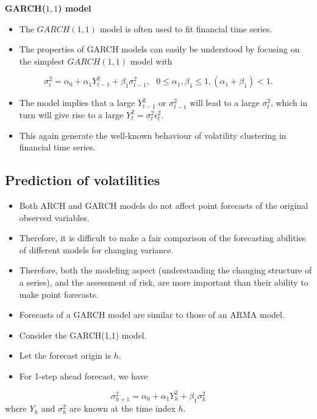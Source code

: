 \documentclass[]{book}
\providecommand{\tightlist}{%
  \setlength{\itemsep}{0pt}\setlength{\parskip}{0pt}}
\begin{document}
\textbf{GARCH(\(1,1\)) model}

\begin{itemize}
\tightlist
\item
  The \(GARCH(1,1)\) model is often used to fit financial time series.
\item
  The properties of GARCH models can easily be understood by focusing
  on the simplest \(GARCH(1,1)\) model with
\end{itemize}

\[\sigma_t^2 = \alpha_0+\alpha_1Y_{t-1}^2 + \beta_1\sigma_{t-1}^2, \text{  } 0\leq\alpha_1, \beta_1\leq 1, (\alpha_1+\beta_1)<1.\]

\begin{itemize}
\tightlist
\item
  The model implies that a large \(Y_{t-1}^2\) or \(\sigma_{t-1}^2\) will lead to a large \(\sigma_{t}^2\), which in turn will give rise to a large \(Y_t^2=\sigma_t^2\epsilon_t^2.\)
\item
  This again generate the well-known behaviour of volatility clustering in financial time series.
\end{itemize}

\hypertarget{prediction-of-volatilities}{%
\subsection{Prediction of volatilities}\label{prediction-of-volatilities}}

\begin{itemize}
\tightlist
\item
  Both ARCH and GARCH models do not affect point forecasts of the original observed variables.
\item
  Therefore, it is difficult to make a fair comparison of the forecasting abilities of different models for changing variance.
\item
  Therefore, both the modeling aspect (understanding the changing structure of a series), and the assessment of risk, are more important than their ability to make point forecasts.
\item
  Forecasts of a GARCH model are similar to those of an ARMA model.
\item
  Consider the GARCH(1,1) model.
\item
  Let the forecast origin is \(h\).
\item
  For 1-step ahead forecast, we have
\end{itemize}

\[\sigma_{h+1}^2 = \alpha_0+\alpha_1Y_h^2+\beta_1\sigma_h^2\]
where \(Y_h\) and \(\sigma_h^2\) are known at the time index \(h\).
\end{document}
